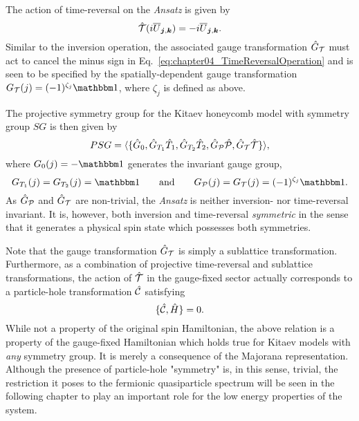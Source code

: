 The action of time-reversal on the \textit{Ansatz} is given by
%
\begin{equation}
	\hat{\mathcal{T}} (i \overline{U}_{\bm{j}, \bm{k}}) = -i \overline{U}_{\bm{j}, \bm{k}}.
	\label{eq:chapter04_TimeReversalOperation}
\end{equation}
%
Similar to the inversion operation, the associated gauge transformation $\hat{G}_{\mathcal{T}}$ must act to cancel the minus sign in Eq.~\eqref{eq:chapter04_TimeReversalOperation} and is seen to be specified by the spatially-dependent gauge transformation $G_{\mathcal{T}}(j) = (-1)^{\zeta_j} \id$, where $\zeta_j$ is defined as above.

The projective symmetry group for the Kitaev honeycomb model with symmetry group $SG$ is then given by
%
\begin{equation}
	PSG = \langle \{ \hat{G}_0, \hat{G}_{T_1} \hat{T}_1, \hat{G}_{T_2} \hat{T}_2, \hat{G}_{\mathcal{P}} \hat{\mathcal{P}}, \hat{G}_{\mathcal{T}} \hat{\mathcal{T}} \} \rangle,
\end{equation}
%
where $G_0(j) = -\id$ generates the invariant gauge group,
%
\begin{equation}
	G_{T_1}(j) = G_{T_2}(j) = \id \qquad {\rm and } \qquad G_{\mathcal{P}}(j) = G_{\mathcal{T}}(j) = (-1)^{\zeta_j} \id.
\end{equation}
%
As $\hat{G}_\mathcal{P}$ and $\hat{G}_{\mathcal{T}}$ are non-trivial, the \textit{Ansatz} is neither inversion- nor time-reversal invariant.
It is, however, both inversion and time-reversal \textit{symmetric} in the sense that it generates a physical spin state which possesses both symmetries.

Note that the gauge transformation $\hat{G}_{\mathcal{T}}$ is simply a sublattice transformation.
Furthermore, as a combination of projective time-reversal and sublattice transformations, the action of $\hat{\mathcal{T}}$ in the gauge-fixed sector actually corresponds to a particle-hole transformation $\hat{\mathcal{C}}$ satisfying
%
\begin{equation}
	\{\hat{\mathcal{C}}, \hat{H}\} = 0.
	\label{eq:chapter04_ParticleHole}
\end{equation}
%
While not a property of the original spin Hamiltonian, the above relation is a property of the gauge-fixed Hamiltonian which holds true for Kitaev models with \textit{any} symmetry group.
It is merely a consequence of the Majorana representation.
Although the presence of particle-hole "symmetry" is, in this sense, trivial, the restriction it poses to the fermionic quasiparticle spectrum will be seen in the following chapter to play an important role for the low energy properties of the system.


